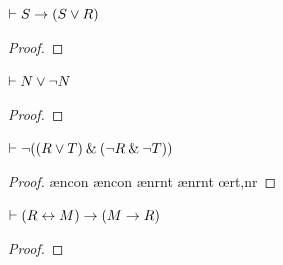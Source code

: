 \begin{small}
\begin{earg}
\noindent\begin{minipage}{0.99\textwidth}
\item $\vdash S \rightarrow (S \vee R)$
\begin{proof}
\open
	 \as{}
	 
	 
\close
{}
\end{proof}
\medskip
\end{minipage}


\item $\vdash N \vee {\neg} N$
\begin{proof}
\open
         \as{}
        \open
                 \as{}
                 
        \close
         
         
         
\close
{} 
\end{proof}
\medskip


\noindent\begin{minipage}{0.99\textwidth}
\item $\vdash {\neg}((R \vee T) \mathbin{\&} ({\neg} R  \mathbin{\&} {\neg} T))$
\begin{proof}
\open
         \as{}
         \ae{ncon}
         \ae{ncon}
         \ae{nrnt}
         \ae{nrnt}
         \oe{rt,nr}
\close
{} 
\end{proof}
\medskip
\end{minipage}

\noindent\begin{minipage}{0.99\textwidth}
\item $\vdash (R \leftrightarrow M) \rightarrow (M \rightarrow R)$
\begin{proof}
\open
         \as{}
        	\open
        	 \as{}
        	 
        \close
         
\close
{} 
\end{proof}
\medskip
\end{minipage}


\end{earg}
\end{small}
